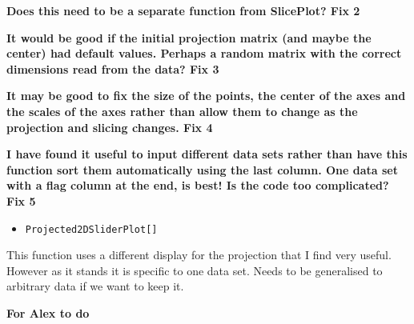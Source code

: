 \documentclass[]{interact}
\theoremstyle{plain}%
\theoremstyle{definition}
\theoremstyle{remark}
\providecommand{\tightlist}{%
  \setlength{\itemsep}{0pt}\setlength{\parskip}{0pt}}
\def\tightlist{}
\begin{document}
\textbf{Does this need to be a separate function from SlicePlot? Fix 2}

\textbf{It would be good if the initial projection matrix (and maybe the
center) had default values. Perhaps a random matrix with the correct
dimensions read from the data? Fix 3}

\textbf{It may be good to fix the size of the points, the center of the
axes and the scales of the axes rather than allow them to change as the
projection and slicing changes. Fix 4}

\textbf{I have found it useful to input different data sets rather than
have this function sort them automatically using the last column. One
data set with a flag column at the end, is best! Is the code too
complicated? Fix 5}

\begin{itemize}
\tightlist
\item
  \texttt{Projected2DSliderPlot{[}{]}}
\end{itemize}

This function uses a different display for the projection that I find
very useful. However as it stands it is specific to one data set. Needs
to be generalised to arbitrary data if we want to keep it.

\textbf{For Alex to do}
\end{document}
